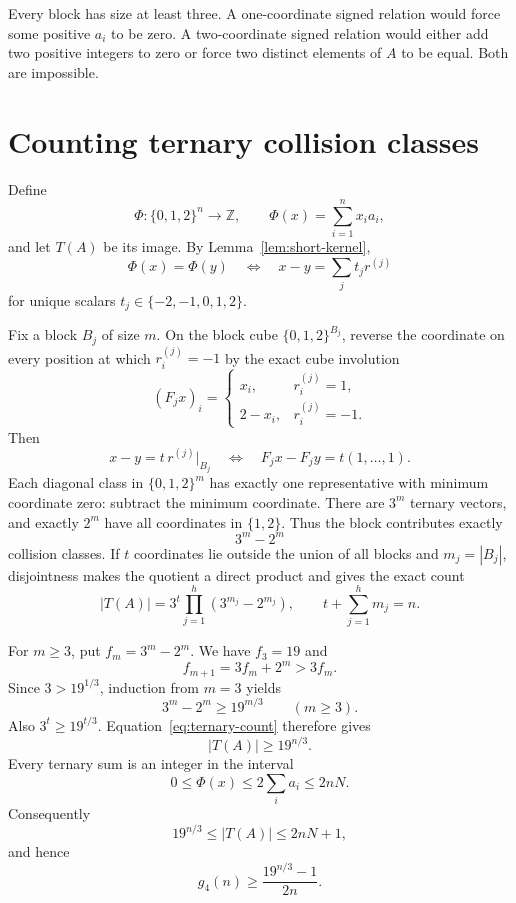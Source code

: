 \documentclass[11pt]{article}
\theoremstyle{remark}
\newcommand{\Z}{\mathbb Z}
\begin{document}
Every block has size at least three.  A one-coordinate signed relation would
force some positive $a_i$ to be zero.  A two-coordinate signed relation would
either add two positive integers to zero or force two distinct elements of
$A$ to be equal.  Both are impossible.

\section{Counting ternary collision classes}\label{sec:lower}

Define
\[
  \Phi:\{0,1,2\}^n\longrightarrow\Z,
  \qquad \Phi(x)=\sum_{i=1}^n x_i a_i,
\]
and let $T(A)$ be its image.  By Lemma~\ref{lem:short-kernel},
\[
  \Phi(x)=\Phi(y)
  \quad\Longleftrightarrow\quad
  x-y=\sum_j t_jr^{(j)}
\]
for unique scalars $t_j\in\{-2,-1,0,1,2\}$.

Fix a block $B_j$ of size $m$.  On the block cube
$\{0,1,2\}^{B_j}$, reverse the coordinate on every position at which
$r^{(j)}_i=-1$ by the exact cube involution
\[
  (F_jx)_i=
  \begin{cases}
    x_i,&r^{(j)}_i=1,\\
    2-x_i,&r^{(j)}_i=-1.
  \end{cases}
\]
Then
\[
  x-y=t\,r^{(j)}|_{B_j}
  \quad\Longleftrightarrow\quad
  F_jx-F_jy=t(1,\ldots,1).
\]
Each diagonal class in $\{0,1,2\}^m$ has exactly one representative with
minimum coordinate zero: subtract the minimum coordinate.  There are $3^m$
ternary vectors, and exactly $2^m$ have all coordinates in $\{1,2\}$.  Thus
the block contributes exactly
\[
  3^m-2^m
\]
collision classes.  If $t$ coordinates lie outside the union of all blocks
and $m_j=|B_j|$, disjointness makes the quotient a direct product and gives
the exact count
\begin{equation}\label{eq:ternary-count}
  |T(A)|=3^t\prod_{j=1}^h(3^{m_j}-2^{m_j}),
  \qquad t+\sum_{j=1}^h m_j=n.
\end{equation}

For $m\ge3$, put $f_m=3^m-2^m$.  We have $f_3=19$ and
\[
  f_{m+1}=3f_m+2^m>3f_m.
\]
Since $3>19^{1/3}$, induction from $m=3$ yields
\[
  3^m-2^m\ge19^{m/3}\qquad(m\ge3).
\]
Also $3^t\ge19^{t/3}$.  Equation~\eqref{eq:ternary-count} therefore gives
\[
  |T(A)|\ge19^{n/3}.
\]
Every ternary sum is an integer in the interval
\[
  0\le\Phi(x)\le2\sum_i a_i\le2nN.
\]
Consequently
\[
  19^{n/3}\le |T(A)|\le2nN+1,
\]
and hence
\begin{equation}\label{eq:lower}
  g_4(n)\ge\frac{19^{n/3}-1}{2n}.
\end{equation}
\end{document}
